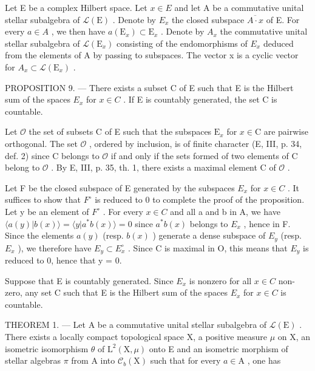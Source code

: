 Let E be a complex Hilbert space. Let \(x \in E\) and let A be a commutative unital stellar subalgebra of \(\mathcal{L}(\mathrm{E})\) . Denote by \(E_{x}\) the closed subspace \(\overline{A \cdot x}\) of E. For every \(a \in A\) , we then have \(a(\mathrm{E}_{x}) \subset \mathrm{E}_{x}\) . Denote by \(A_{x}\) the commutative unital stellar subalgebra of \(\mathcal{L}(\mathrm{E}_{x})\) consisting of the endomorphisms of \(E_{x}\) deduced from the elements of A by passing to subspaces. The vector x is a cyclic vector for \(A_{x} \subset \mathcal{L}(\mathrm{E}_{x})\) .

PROPOSITION 9. --- There exists a subset C of E such that E is the Hilbert sum of the spaces \(E_{x}\) for \(x \in C\) . If E is countably generated, the set C is countable.

Let \(\mathcal{O}\) the set of subsets C of E such that the subspaces \(\mathrm{E}_x\) for \(x\in \mathrm{C}\) are pairwise orthogonal. The set \(\mathcal{O}\) , ordered by inclusion, is of finite character (E, III, p. 34, def. 2) since C belongs to \(\mathcal{O}\) if and only if the sets formed of two elements of C belong to \(\mathcal{O}\) . By E, III, p. 35, th. 1, there exists a maximal element C of \(\mathcal{O}\) .

Let F be the closed subspace of E generated by the subspaces \(E_{x}\) for \(x \in C\) . It suffices to show that \(F^{\circ}\) is reduced to 0 to complete the proof of the proposition. Let y be an element of \(F^{\circ}\) . For every \(x \in C\) and all a and b in A, we have \(\langle a(y) | b(x) \rangle = \langle y | a^{*}b(x) \rangle = 0\) since \(a^{*}b(x)\) belongs to \(E_{x}\) , hence in F. Since the elements \(a(y)\) (resp. \(b(x)\) ) generate a dense subspace of \(E_{y}\) (resp. \(E_{x}\) ), we therefore have \(E_{y} \subset E_{x}^{\circ}\) . Since C is maximal in O, this means that \(E_{y}\) is reduced to 0, hence that y = 0.

Suppose that E is countably generated. Since \(E_{x}\) is nonzero for all \(x \in C\) non-zero, any set C such that E is the Hilbert sum of the spaces \(E_{x}\) for \(x \in C\) is countable.

THEOREM 1. --- Let A be a commutative unital stellar subalgebra of \(\mathcal{L}(\mathrm{E})\) . There exists a locally compact topological space X, a positive measure \(\mu\) on X, an isometric isomorphism \(\theta\) of \(\mathrm{L}^2 (\mathrm{X},\mu)\) onto E and an isometric morphism of stellar algebras \(\pi\) from A into \(\mathcal{C}_b(\mathrm{X})\) such that for every \(a\in \mathrm{A}\) , one has

